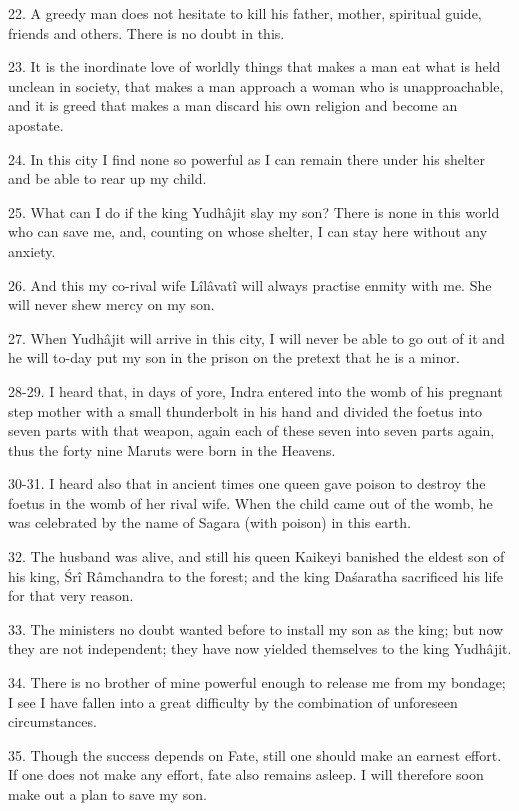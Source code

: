 22. A greedy man does not hesitate to kill his father, mother, spiritual guide, friends and others. There is no doubt in this.

23. It is the inordinate love of worldly things that makes a man eat what is held unclean in society, that makes a man approach a woman who is unapproachable, and it is greed that makes a man discard his own religion and become an apostate.

24. In this city I find none so powerful as I can remain there under his shelter and be able to rear up my child.

25. What can I do if the king Yudh\^ajit slay my son? There is none in this world who can save me, and, counting on whose shelter, I can stay here without any anxiety.

26. And this my co-rival wife L\^il\^avat\^i will always practise enmity with me. She will never shew mercy on my son.

27. When Yudh\^ajit will arrive in this city, I will never be able to go out of it and he will to-day put my son in the prison on the pretext that he is a minor.

28-29. I heard that, in days of yore, Indra entered into the womb of his pregnant step mother with a small thunderbolt in his hand and divided the foetus into seven parts with that weapon, again each of these seven into seven parts again, thus the forty nine Maruts were born in the Heavens.

30-31. I heard also that in ancient times one queen gave poison to destroy the foetus in the womb of her rival wife. When the child came out of the womb, he was celebrated by the name of Sagara (with poison) in this earth.

32. The husband was alive, and still his queen Kaikeyi banished the eldest son of his king, \'Sr\^i R\^amchandra to the forest; and the king Da\'saratha sacrificed his life for that very reason.

33. The ministers no doubt wanted before to install my son as the king; but now they are not independent; they have now yielded themselves to the king Yudh\^ajit.

34. There is no brother of mine powerful enough to release me from my bondage; I see I have fallen into a great difficulty by the combination of unforeseen circumstances.

35. Though the success depends on Fate, still one should make an earnest effort. If one does not make any effort, fate also remains asleep. I will therefore soon make out a plan to save my son.


